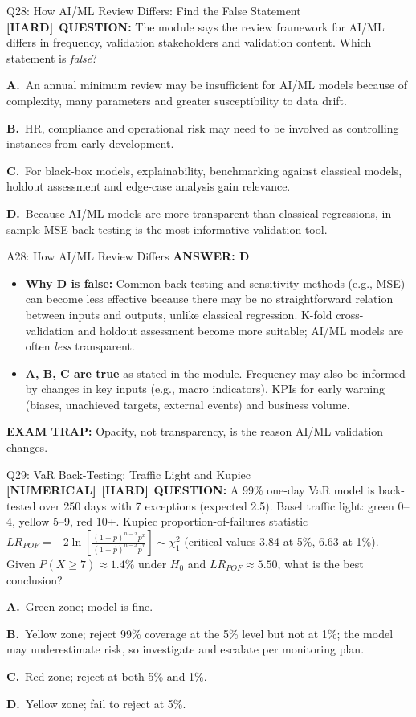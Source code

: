 \documentclass[8pt]{beamer}
\newcommand{\fs}{\fontsize{10}{12}\selectfont}
\newcommand{\opts}[4]{\par\vspace{0.12cm}\noindent\textbf{A.}~#1\par\vspace{0.08cm}\noindent\textbf{B.}~#2\par\vspace{0.08cm}\noindent\textbf{C.}~#3\par\vspace{0.08cm}\noindent\textbf{D.}~#4\par}
\newcommand{\ans}[1]{\textcolor{myblue}{\textbf{ANSWER: #1}}}
\newcommand{\trap}[1]{\textcolor{myred}{\textbf{EXAM TRAP:}} #1}
\newcommand{\numtag}{\textcolor{mypurple}{\textbf{[NUMERICAL]}}}
\newcommand{\hard}{\textcolor{myorange}{\textbf{[HARD]}}}
\begin{document}
\begin{frame}[t]{Q28: How AI/ML Review Differs: Find the False Statement}
\fs
\hard\ \textbf{QUESTION:} The module says the review framework for AI/ML differs in frequency, validation stakeholders and validation content. Which statement is \emph{false}?
\opts{An annual minimum review may be insufficient for AI/ML models because of complexity, many parameters and greater susceptibility to data drift.}
{HR, compliance and operational risk may need to be involved as controlling instances from early development.}
{For black-box models, explainability, benchmarking against classical models, holdout assessment and edge-case analysis gain relevance.}
{Because AI/ML models are more transparent than classical regressions, in-sample MSE back-testing is the most informative validation tool.}
\end{frame}

\begin{frame}[t]{A28: How AI/ML Review Differs}
\fs
\ans{D}
\begin{itemize}
\item \textbf{Why D is false:} Common back-testing and sensitivity methods (e.g., MSE) can become less effective because there may be no straightforward relation between inputs and outputs, unlike classical regression. K-fold cross-validation and holdout assessment become more suitable; AI/ML models are often \emph{less} transparent.
\item \textbf{A, B, C are true} as stated in the module. Frequency may also be informed by changes in key inputs (e.g., macro indicators), KPIs for early warning (biases, unachieved targets, external events) and business volume.
\end{itemize}
\trap{Opacity, not transparency, is the reason AI/ML validation \textcolor{myblue}{changes}.}
\end{frame}

\begin{frame}[t]{Q29: VaR Back-Testing: Traffic Light and Kupiec}
\fs
\numtag\ \hard\ \textbf{QUESTION:} A 99\% one-day VaR model is back-tested over 250 days with 7 exceptions (expected 2.5). Basel traffic light: green 0--4, yellow 5--9, red 10+. Kupiec proportion-of-failures statistic $LR_{POF}=-2\ln\!\left[\frac{(1-p)^{n-x}p^x}{(1-\hat p)^{n-x}\hat p^x}\right]\sim\chi^2_1$ (critical values 3.84 at 5\%, 6.63 at 1\%). Given $P(X\ge7)\approx1.4\%$ under $H_0$ and $LR_{POF}\approx5.50$, what is the best conclusion?
\opts{Green zone; model is fine.}
{Yellow zone; reject 99\% coverage at the 5\% level but not at 1\%; the model may underestimate risk, so investigate and escalate per monitoring plan.}
{Red zone; reject at both 5\% and 1\%.}
{Yellow zone; fail to reject at 5\%.}
\end{frame}
\end{document}
